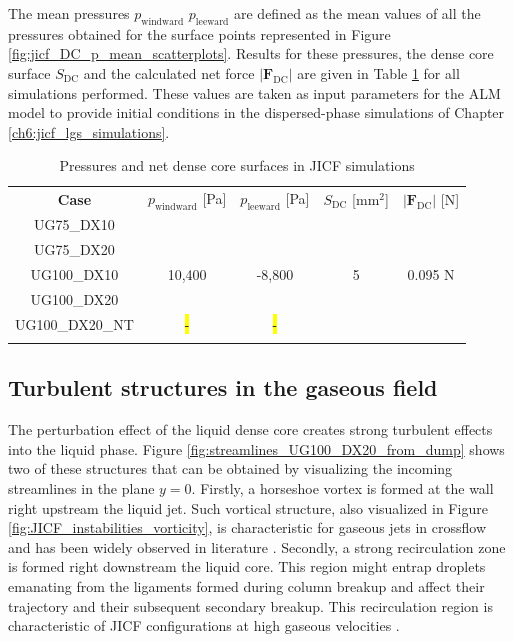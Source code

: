 The mean pressures $p_\mathrm{windward}$ $p_\mathrm{leeward}$ are defined as the mean values of all the pressures obtained for the surface points represented in Figure \ref{fig:jicf_DC_p_mean_scatterplots}. Results for these pressures, the dense core surface $S_\mathrm{DC}$ and the calculated net force $|\boldsymbol{F}_\mathrm{DC}|$ are given in Table \ref{tab:dense_core_pressures_and_force_parameters} for all simulations performed. These values are taken as input parameters for the ALM model to provide initial conditions in the dispersed-phase simulations of Chapter \ref{ch6:jicf_lgs_simulations}.


\begin{table}[!h]
\centering
\caption{Pressures and net dense core surfaces in JICF simulations}
\begin{tabular}{ccccc}
\thickhline
\textbf{Case} & $p_\mathrm{windward}$ [Pa] & $p_\mathrm{leeward}$ [Pa] & $S_\mathrm{DC}$ [mm$^2$]& $|\boldsymbol{F}_\mathrm{DC}|$ [N] \\
\thickhline 
UG75\_DX10  & & & &  \\
UG75\_DX20  & & & & \\
UG100\_DX10 & 10,400 & -8,800 & 5 & 0.095 N \\
UG100\_DX20 & & & & \\
UG100\_DX20\_NT & \hl{-} & \hl{-} & & \\
\thickhline
\end{tabular}
\label{tab:dense_core_pressures_and_force_parameters}
\end{table}



\subsection{Turbulent structures in the gaseous field}
\label{ch5:subsec_turbulent_structures_in_gaseous_field}

The perturbation effect of the liquid dense core creates strong turbulent effects into the liquid phase. Figure \ref{fig:streamlines_UG100_DX20_from_dump} shows two of these structures that can be obtained by visualizing the incoming streamlines in the plane $y = 0$. Firstly, a horseshoe vortex is formed at the wall right upstream the liquid jet. Such vortical structure, also visualized in Figure \ref{fig:JICF_instabilities_vorticity}, is characteristic for gaseous jets in crossflow and has been widely observed in literature . Secondly, a strong recirculation zone is formed right downstream the liquid core. This region might entrap droplets emanating from the ligaments formed during column breakup and affect their trajectory and their subsequent secondary breakup. This recirculation region is characteristic of JICF configurations at high gaseous velocities .

